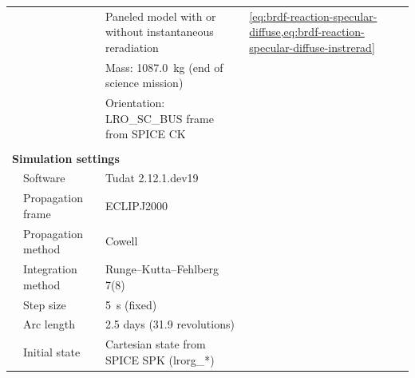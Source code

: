 \begin{table}[t]
\begin{tabularx}{\textwidth}{llXl}
     &                       & Paneled model with or without instantaneous reradiation         & \cref{eq:brdf-reaction-specular-diffuse,eq:brdf-reaction-specular-diffuse-instrerad}                                   \\
     &                       & Mass: \qty{1087.0}{kg} (end of science mission)         &                                    \\
     &                       & Orientation: LRO\_SC\_BUS frame from SPICE CK      &     \\
     &                       &       &                                                    \\
    \multicolumn{3}{l}{\textbf{Simulation settings}}                                     \\
     & Software   & \acrfull{Tudat} 2.12.1.dev19                    &                \\
     & Propagation frame     & ECLIPJ2000            &                                    \\
     & Propagation method    & Cowell             &                                       \\
     & Integration method    & Runge--Kutta--Fehlberg 7(8)           &                      \\
     & Step size & \qty{5}{s} (fixed)    &                                           \\
     & Arc length            & 2.5 days (31.9 revolutions)   &                            \\
     & Initial state         & Cartesian state from SPICE SPK (lrorg\_*)      &            \\ \bottomrule
    \end{tabularx}
\end{table}

